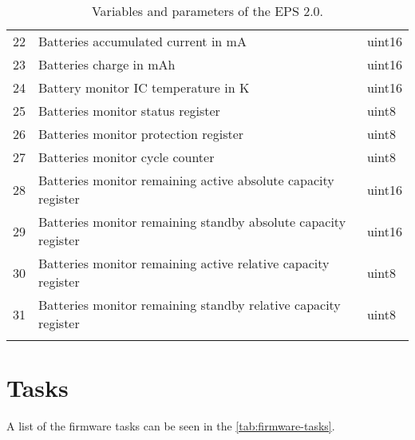 \begin{longtable}[c]{cL{0.82\textwidth}l}
    22  & Batteries accumulated current in mA                               & uint16 \\
    23  & Batteries charge in mAh                                           & uint16 \\
    24  & Battery monitor IC temperature in K                               & uint16 \\
    25  & Batteries monitor status register                                 & uint8 \\
    26  & Batteries monitor protection register                             & uint8 \\
    27  & Batteries monitor cycle counter                                   & uint8 \\
    28  & Batteries monitor remaining active absolute capacity register     & uint16 \\
    29  & Batteries monitor remaining standby absolute capacity register    & uint16 \\
    30  & Batteries monitor remaining active relative capacity register     & uint8 \\
    31  & Batteries monitor remaining standby relative capacity register    & uint8 \\
    \bottomrule[1.5pt]
    \caption{Variables and parameters of the EPS 2.0.}
    \label{tab:eps2-variables}
\end{longtable}

\section{Tasks}

A list of the firmware tasks can be seen in the \autoref{tab:firmware-tasks}.

